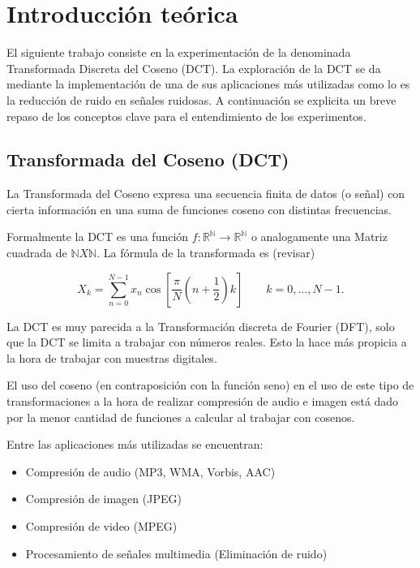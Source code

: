 \section{Introducci\'on te\'orica}

El siguiente trabajo consiste en la experimentaci\'on de la denominada 
Transformada Discreta del Coseno (DCT). La exploraci\'on de la DCT se da
mediante la implementaci\'on de una de sus aplicaciones m\'as utilizadas como lo
es la reducci\'on de ruido en se\~nales ruidosas. A continuaci\'on se explicita
un breve repaso de los conceptos clave para el entendimiento de los
experimentos.

\subsection{Transformada del Coseno (DCT)}

La Transformada del Coseno expresa una secuencia finita de datos (o se\~nal) 
con cierta informaci\'on en una suma de funciones coseno con distintas 
frecuencias.

Formalmente la DCT es una funci\'on $f:\mathbb{R}^\mathbb{N} \to \mathbb{R}^
\mathbb{N}$ o analogamente una
Matriz cuadrada de $\mathbb{N} X \mathbb{N}$. La f\'ormula de la transformada es
(revisar)

$$X_k = \sum_{n=0}^{N-1} x_n \cos \left[\frac{\pi}{N} \left(n+\frac{1}{2}\right) 
k \right] \quad \quad k = 0, \dots, N-1.$$ 

La DCT es muy parecida a la Transformaci\'on discreta de Fourier (DFT), solo que
la DCT se limita a trabajar con n\'umeros reales. Esto la hace m\'as propicia a
la hora de trabajar con muestras digitales.

El uso del coseno (en contraposici\'on con la funci\'on seno) en el uso de este
tipo de transformaciones a la hora de realizar compresi\'on de audio e imagen
est\'a dado por la menor cantidad de funciones a calcular al trabajar con
cosenos.

Entre las aplicaciones m\'as utilizadas se encuentran:

\begin{itemize}
\item Compresi\'on de audio (MP3, WMA, Vorbis, AAC)
\item Compresi\'on de imagen (JPEG)
\item Compresi\'on de video (MPEG)
\item Procesamiento de se\~nales multimedia (Eliminaci\'on de ruido)
\end{itemize}


